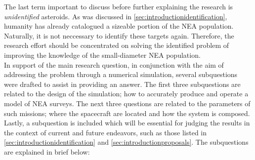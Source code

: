 The last term important to discuss before further explaining the research is \textit{unidentified} asteroids. As was discussed in \autoref{sec:introductionidentification}, humanity has already catalogued a sizeable portion of the NEA population. Naturally, it is not neccessary to identify these targets again. Therefore, the research effort should be concentrated on solving the identified problem of improving the knowledge of the small-diameter NEA population. \\

In support of the main research question, in conjunction with the aim of addressing the problem through a numerical simulation, several subquestions were drafted to assist in providing an answer. The first three subquestions are related to the design of the simulation; how to accurately produce and operate a model of NEA surveys. The next three questions are related to the parameters of such missions; where the spacecraft are located and how the system is composed. Lastly, a subquestion is included which will be essential for judging the results in the context of current and future endeavors, such as those listed in \autoref{sec:introductionidentification} and \autoref{sec:introductionproposals}. The subquestions are explained in brief below:
